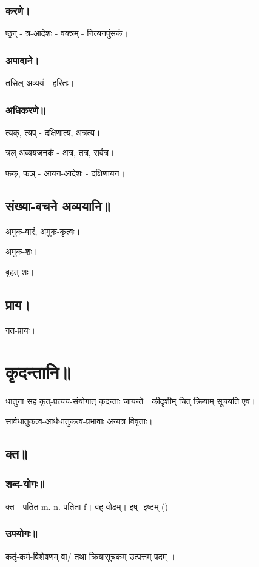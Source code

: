 \documentclass[oneside, article]{memoir}
\begin{document}
\subsubsection{करणे।}
ष्ठ्रन् - त्र-आदेशः - वक्त्रम् - नित्यनपुंसकं।

\subsubsection{अपादाने।}
तसिल् अव्ययं - हरितः।

\subsubsection{अधिकरणे॥}
त्यक्, त्यप् - दक्षिणात्य, अत्रत्य।

त्रल् अव्ययजनकं - अत्र, तत्र, सर्वत्र।

फक्, फञ् - आयन-आदेशः - दक्षिणायन।


\subsection{संख्या-वचने अव्ययानि॥}
अमुक-वारं, अमुक-कृत्वः।

अमुक-शः।

बृहत्-शः।

\subsection{प्राय।}
गत-प्रायः। 

\section{कृदन्तानि॥}
धातुना सह कृत्-प्रत्यय-संयोगात् कृदन्ताः जायन्ते। कीदृशीम् चित् क्रियाम् सूचयति एव। 

सार्वधातुकत्व-आर्धधातुकत्व-प्रभावाः अन्यत्र विवृताः।

\subsection{क्त॥}
\subsubsection{शब्द-योगः॥}
क्त - पतित m. n. पतिता f। वह्-वोढम्। इष्- इष्टम् ()। 

\subsubsection{उपयोगः॥}
कर्तृ-कर्म-विशेषणम् वा/ तथा क्रियासूचकम् उत्पत्तम् पदम् ।
\end{document}
